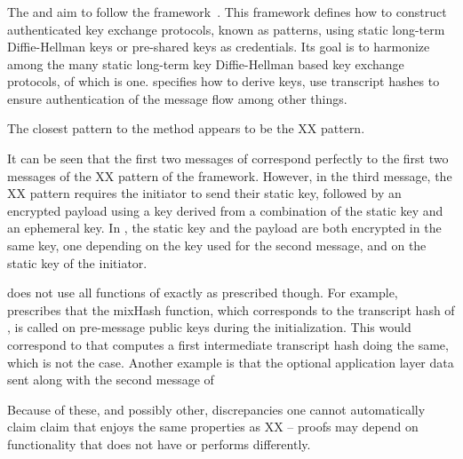 \subsubsection{\mNoise{}}
The \mStatStat{} and \mPskPsk{} aim to follow the \mNoise{}
framework~\cite{perrin2016noise}.
%
This framework defines how to construct authenticated key exchange protocols,
known as patterns, using static long-term Diffie-Hellman keys or pre-shared
keys as credentials.
%
Its goal is to harmonize among the many static long-term key Diffie-Hellman 
based key exchange protocols, of which \mOptls{} is one.
%
\mNoise{} specifies how to derive keys, use transcript hashes to ensure
authentication of the message flow among other things.
%

The closest \mNoise{} pattern to the \mStatStat{} method appears to be the
XX pattern.
%

{\color{blue}
It can be seen that the first two messages of \mStatStat{}
correspond perfectly to the first two messages of the XX pattern of
the \mNoise{} framework.
%
However, in the third message, the XX pattern requires
the initiator to send their static key, followed by an encrypted payload using a
key derived from a combination of the static key and an ephemeral key.
%
In \mEdhoc{}, the static key and the payload are both encrypted in the same key, one depending on the key used for the second message, and on the static key of the initiator.
}

\mEdhoc{} does not use all functions of \mNoise{} exactly as prescribed though.
%
For example, \mNoise{} prescribes that the mixHash function, which corresponds
to the transcript hash of \mEdhoc{}, is called on pre-message public keys
during the initialization.
%
This would correspond to that \mEdhoc{} computes a first intermediate transcript
hash doing the same, which is not the case.
%
Another example is that the optional application layer data sent along with
the second message of \mNoise{}

Because of these, and possibly other, discrepancies one cannot automatically
claim claim that \mEdhoc{} enjoys
the same properties as XX -- proofs may depend on functionality that \mEdhoc{}
does not have or performs differently.
%

